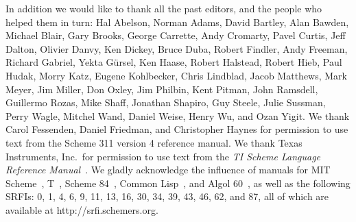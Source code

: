 In addition we would like to thank all the past editors, and the
people who helped them in turn: Hal Abelson, Norman Adams, David
Bartley, Alan Bawden, Michael Blair, Gary Brooks, George Carrette,
Andy Cromarty, Pavel Curtis, Jeff Dalton, Olivier Danvy, Ken Dickey,
Bruce Duba, Robert Findler, Andy Freeman, Richard Gabriel, Yekta
G\"ursel, Ken Haase, Robert Halstead, Robert Hieb, Paul Hudak, Morry
Katz, Eugene Kohlbecker, Chris Lindblad, Jacob Matthews, Mark Meyer,
Jim Miller, Don Oxley, Jim Philbin, Kent Pitman, John Ramsdell,
Guillermo Rozas, Mike Shaff, Jonathan Shapiro, Guy Steele, Julie
Sussman, Perry Wagle, Mitchel Wand, Daniel Weise, Henry Wu, and Ozan
Yigit.  We thank Carol Fessenden, Daniel Friedman, and Christopher
Haynes for permission to use text from the Scheme 311 version 4
reference manual.  We thank Texas Instruments, Inc.~for permission to
use text from the {\em TI Scheme Language Reference
Manual}~\cite{TImanual85}.  We gladly acknowledge the influence of
manuals for MIT Scheme~\cite{MITScheme}, T~\cite{Rees84}, Scheme
84~\cite{Scheme84}, Common Lisp~\cite{CLtL}, and Algol 60~\cite{Naur63},
as well as the following SRFIs:  0, 1, 4, 6, 9, 11, 13, 16, 30, 34, 39, 43, 46, 62, and 87,
all of which are available at {\cf http://srfi.schemers.org}.


